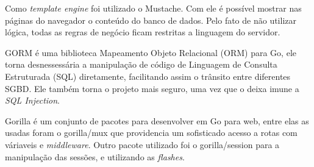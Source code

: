 Como \textit{template engine} foi utilizado o Mustache. Com ele é possível mostrar nas páginas do navegador o conteúdo do banco de dados. Pelo fato de não utilizar lógica, todas as regras de negócio ficam restritas a linguagem do servidor.

GORM é uma biblioteca Mapeamento Objeto Relacional (ORM) para Go, ele torna desnessessária a manipulação de código de Linguagem de Consulta Estruturada (SQL) diretamente, facilitando assim o trânsito entre diferentes SGBD. Ele também torna o projeto mais seguro, uma vez que o deixa imune a \textit{SQL Injection}.

Gorilla é um conjunto de pacotes para desenvolver em Go para web, entre elas as usadas foram o gorilla/mux que providencia um sofisticado acesso a rotas com váriaveis e \textit{middleware}. Outro pacote utilizado foi o gorilla/session para a manipulação das sessões, e utilizando as \textit{flashes}.
